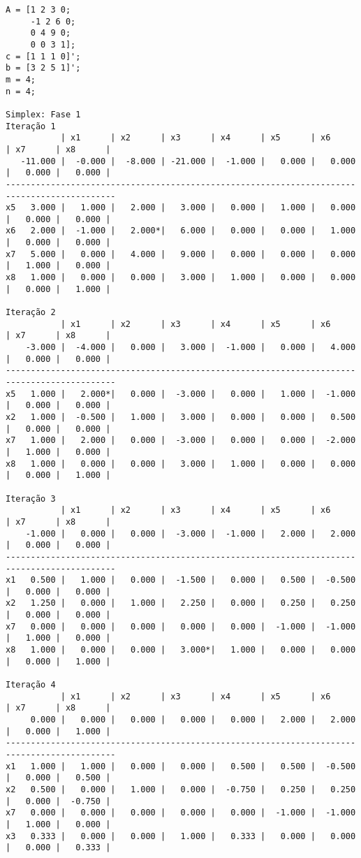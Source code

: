\documentclass[brazil,times]{abnt}
\begin{document}
{\scriptsize \begin{verbatim}
A = [1 2 3 0;
	 -1 2 6 0;
	 0 4 9 0;
	 0 0 3 1];
c = [1 1 1 0]';
b = [3 2 5 1]';
m = 4;
n = 4;

Simplex: Fase 1
Iteração 1
           | x1      | x2      | x3      | x4      | x5      | x6      | x7      | x8      |
   -11.000 |  -0.000 |  -8.000 | -21.000 |  -1.000 |   0.000 |   0.000 |   0.000 |   0.000 |
--------------------------------------------------------------------------------------------
x5   3.000 |   1.000 |   2.000 |   3.000 |   0.000 |   1.000 |   0.000 |   0.000 |   0.000 |
x6   2.000 |  -1.000 |   2.000*|   6.000 |   0.000 |   0.000 |   1.000 |   0.000 |   0.000 |
x7   5.000 |   0.000 |   4.000 |   9.000 |   0.000 |   0.000 |   0.000 |   1.000 |   0.000 |
x8   1.000 |   0.000 |   0.000 |   3.000 |   1.000 |   0.000 |   0.000 |   0.000 |   1.000 |

Iteração 2
           | x1      | x2      | x3      | x4      | x5      | x6      | x7      | x8      |
    -3.000 |  -4.000 |   0.000 |   3.000 |  -1.000 |   0.000 |   4.000 |   0.000 |   0.000 |
--------------------------------------------------------------------------------------------
x5   1.000 |   2.000*|   0.000 |  -3.000 |   0.000 |   1.000 |  -1.000 |   0.000 |   0.000 |
x2   1.000 |  -0.500 |   1.000 |   3.000 |   0.000 |   0.000 |   0.500 |   0.000 |   0.000 |
x7   1.000 |   2.000 |   0.000 |  -3.000 |   0.000 |   0.000 |  -2.000 |   1.000 |   0.000 |
x8   1.000 |   0.000 |   0.000 |   3.000 |   1.000 |   0.000 |   0.000 |   0.000 |   1.000 |

Iteração 3
           | x1      | x2      | x3      | x4      | x5      | x6      | x7      | x8      |
    -1.000 |   0.000 |   0.000 |  -3.000 |  -1.000 |   2.000 |   2.000 |   0.000 |   0.000 |
--------------------------------------------------------------------------------------------
x1   0.500 |   1.000 |   0.000 |  -1.500 |   0.000 |   0.500 |  -0.500 |   0.000 |   0.000 |
x2   1.250 |   0.000 |   1.000 |   2.250 |   0.000 |   0.250 |   0.250 |   0.000 |   0.000 |
x7   0.000 |   0.000 |   0.000 |   0.000 |   0.000 |  -1.000 |  -1.000 |   1.000 |   0.000 |
x8   1.000 |   0.000 |   0.000 |   3.000*|   1.000 |   0.000 |   0.000 |   0.000 |   1.000 |

Iteração 4
           | x1      | x2      | x3      | x4      | x5      | x6      | x7      | x8      |
     0.000 |   0.000 |   0.000 |   0.000 |   0.000 |   2.000 |   2.000 |   0.000 |   1.000 |
--------------------------------------------------------------------------------------------
x1   1.000 |   1.000 |   0.000 |   0.000 |   0.500 |   0.500 |  -0.500 |   0.000 |   0.500 |
x2   0.500 |   0.000 |   1.000 |   0.000 |  -0.750 |   0.250 |   0.250 |   0.000 |  -0.750 |
x7   0.000 |   0.000 |   0.000 |   0.000 |   0.000 |  -1.000 |  -1.000 |   1.000 |   0.000 |
x3   0.333 |   0.000 |   0.000 |   1.000 |   0.333 |   0.000 |   0.000 |   0.000 |   0.333 |


\end{verbatim}}
\end{document}
